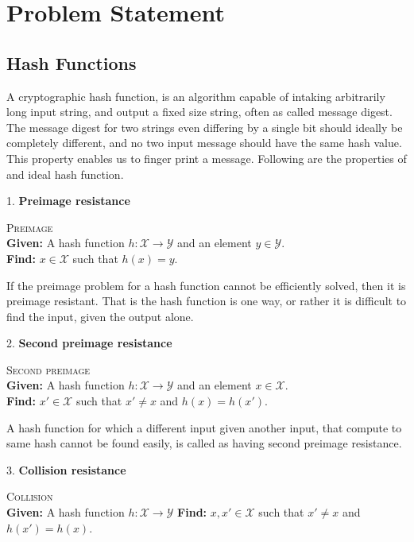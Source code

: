 \documentclass[12pt]{artikel3}                  %
\begin{document}
\clearpage

\section{Problem Statement}

\subsection{Hash Functions}
A cryptographic hash function, is an algorithm capable of intaking arbitrarily long input string, and
output a fixed size string, often as called message digest. The message digest for two strings
even differing by a single bit should ideally be completely different, and no two input message should
have the same hash value. This property enables us to finger print a message. Following are the properties
of and ideal hash function\cite{00005}.
  
1. {\bf Preimage resistance}
\begin{center}
  \framebox
  {
    \parbox{350pt}
    {
      \centering \textsc{Preimage} \\
      {\bf Given:} A hash function $h : \mathcal{X} \to \mathcal{Y}$ and an element $y \in \mathcal{Y}$. \\
      {\bf Find:} $x \in \mathcal{X}$ such that $h(x) = y$. 
    }
  }
\end{center}
\vspace{4mm}
If the preimage problem for a hash function cannot be efficiently solved, then it is preimage resistant.
That is the hash function is one way, or rather it is difficult to find the input, given the output alone.

2. {\bf Second preimage resistance}
\begin{center}
  \framebox
  {
    \parbox{350pt}
    {
      \centering \textsc{Second preimage} \\
      {\bf Given:} A hash function $h : \mathcal{X} \to \mathcal{Y}$ and an element $x \in \mathcal{X}$. \\
      {\bf Find:} $x' \in \mathcal{X}$ such that $x' \neq x$ and $h(x) = h(x')$. 
    }
  }
\end{center}
\vspace{4mm}

A hash function for which a different input given another input, that compute to same hash cannot be found 
easily, is called as having second preimage resistance.

3. {\bf Collision resistance}
\begin{center}
  \framebox
  {
    \parbox{350pt}
    {
      \centering \textsc{Collision} \\
      {\bf Given:} A hash function $h : \mathcal{X} \to \mathcal{Y}$ 
      {\bf Find:} $x, x' \in \mathcal{X}$ such that $x' \neq x$ and $h(x') = h(x)$. 
    }
  }
\end{center}
\vspace{4mm}
\end{document}
